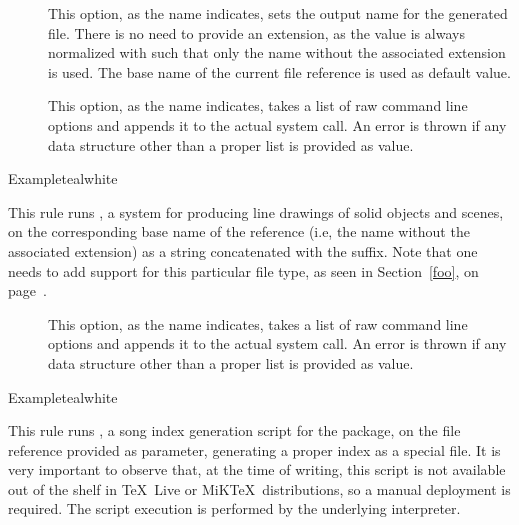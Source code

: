 \begin{description}
\begin{description}
\item[] This option, as the name indicates, sets the output name for the generated  file. There is no need to provide an extension, as the value is always normalized with  such that only the name without the associated extension is used. The base name of the current file reference is used as default value.

\item[] This option, as the name indicates, takes a list of raw command line options and appends it to the actual system call. An error is thrown if any data structure other than a proper list is provided as value.
\end{description}

\begin{codebox}{Example}{teal}{\icnote}{white}
\end{codebox}

\item[\rulebox{sketch}{Sergey Ulyanov, Paulo Cereda}] This rule runs , a system for producing line drawings of solid objects and scenes, on the corresponding base name of the  reference (i.e, the name without the associated extension) as a string concatenated with the  suffix. Note that one needs to add support for this particular file type, as seen in Section~\ref{foo}, on page~\pageref{foo}.

\begin{description}
\item[] This option, as the name indicates, takes a list of raw command line options and appends it to the actual system call. An error is thrown if any data structure other than a proper list is provided as value.
\end{description}

\begin{codebox}{Example}{teal}{\icnote}{white}
\end{codebox}

\item[\rulebox{songidx}{Francesco Endrici, Paulo Cereda}] This rule runs , a song index generation script for the  package, on the file reference provided as parameter, generating a proper index as a special  file. It is very important to observe that, at the time of writing, this script is not available out of the shelf in \TeX\ Live or MiK\TeX\ distributions, so a manual deployment is required. The script execution is performed by the underlying  interpreter.


\end{description}
